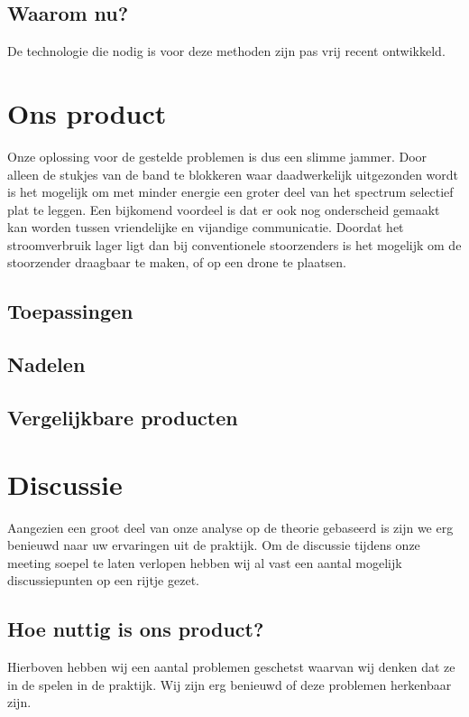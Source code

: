 \documentclass[oneside, a4paper, openany]{memoir}
\begin{document}
\section{Waarom nu?}
De technologie die nodig is voor deze methoden zijn pas vrij recent ontwikkeld.


\chapter{Ons product}
Onze oplossing voor de gestelde problemen is dus een slimme jammer. Door alleen de stukjes van de band te blokkeren waar daadwerkelijk uitgezonden wordt is het mogelijk om met minder energie een groter deel van het spectrum selectief plat te leggen. Een bijkomend voordeel is dat er ook nog onderscheid gemaakt kan worden tussen vriendelijke en vijandige communicatie. Doordat het stroomverbruik lager ligt dan bij conventionele stoorzenders is het mogelijk om de stoorzender draagbaar te maken, of op een drone te plaatsen.
\section{Toepassingen}

\section{Nadelen}

\section{Vergelijkbare producten}

\chapter{Discussie}
Aangezien een groot deel van onze analyse op de theorie gebaseerd is zijn we erg benieuwd naar uw ervaringen uit de praktijk. Om de discussie tijdens onze meeting soepel te laten verlopen hebben wij al vast een aantal mogelijk discussiepunten op een rijtje gezet.

\section{Hoe nuttig is ons product?}
Hierboven hebben wij een aantal problemen geschetst waarvan wij denken dat ze in de spelen in de praktijk. Wij zijn erg benieuwd of deze problemen herkenbaar zijn.
\end{document}
